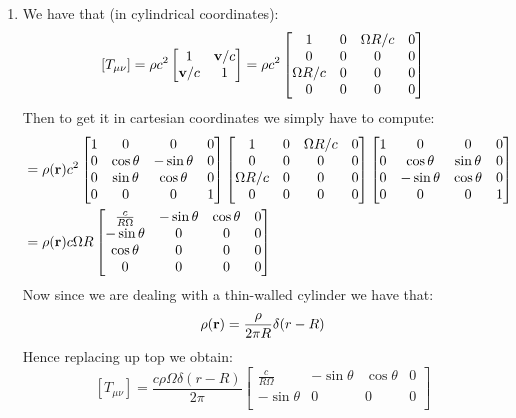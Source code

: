 \documentclass[10pt,a4paper]{article}
\begin{document}
\begin{enumerate}
\item We have that (in cylindrical coordinates):
\[
[T_{\mu \nu}] = \rho c^2 \begin{bmatrix}
1 & \vb{v}/c\\
\vb{v}/c & 1
\end{bmatrix} = \rho c^2 \begin{bmatrix}
1 & 0 & \Omega R /c & 0\\
0 & 0 & 0 & 0\\
\Omega R/c & 0 & 0 & 0\\
0 & 0 & 0 & 0
\end{bmatrix}
\]
Then to get it in cartesian coordinates we simply have to compute:
\begin{align*}
[T_{\mu \nu}] &= \rho(\vb{r}) c^2 \begin{bmatrix}
1 & 0 & 0 & 0\\
0 & \cos \theta & -\sin\theta & 0\\
0 & \sin \theta & \cos \theta & 0 \\
0 & 0 & 0 & 1
\end{bmatrix} \begin{bmatrix}
1 & 0 & \Omega R /c & 0\\
0 & 0 & 0 & 0\\
\Omega R/c & 0 & 0 & 0\\
0 & 0 & 0 & 0
\end{bmatrix}\begin{bmatrix}
1 & 0 & 0 & 0\\
0 & \cos \theta & \sin\theta & 0\\
0 & -\sin \theta & \cos \theta & 0 \\
0 & 0 & 0 & 1
\end{bmatrix}\\
&= \rho(\vb{r}) c \Omega R \begin{bmatrix}
\frac{c}{R \Omega} & -\sin\theta & \cos\theta & 0\\
-\sin\theta & 0 & 0 & 0\\
\cos\theta & 0 & 0 & 0\\
0 & 0 &0 &0 
\end{bmatrix}
\end{align*}
Now since we are dealing with a thin-walled cylinder we have that:
\[
\rho(\vb{r}) = \frac{\rho}{2\pi R} \delta(r - R) 
\]
Hence replacing up top we obtain:
\[
[T_{\mu\nu}] = \frac{c \rho \Omega \delta(r - R)}{2\pi} \begin{bmatrix}
\frac{c}{R \Omega} & -\sin\theta & \cos\theta & 0\\
-\sin\theta & 0 & 0 & 0\\

\end{bmatrix}\]
\end{enumerate}
\end{document}
